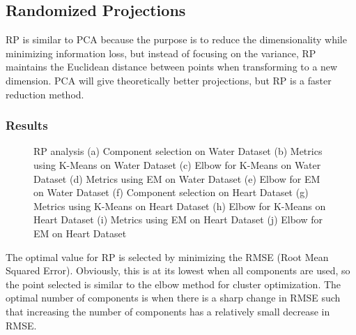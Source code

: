 \documentclass[
	letterpaper, %
]{mlreport}
\begin{document}
\subsection{Randomized Projections}
RP is similar to PCA because the purpose is to reduce the dimensionality while minimizing information loss, but instead of focusing on the variance, RP maintains the Euclidean distance between points when transforming to a new dimension. PCA will give theoretically better projections, but RP is a faster reduction method.

\subsubsection{Results}
\begin{figure}
	\centering
	\caption{RP analysis (a) Component selection on Water Dataset (b) Metrics using K-Means on Water Dataset (c) Elbow for K-Means on Water Dataset (d) Metrics using EM on Water Dataset (e) Elbow for EM on Water Dataset (f) Component selection on Heart Dataset (g) Metrics using K-Means on Heart Dataset (h) Elbow for K-Means on Heart Dataset (i) Metrics using EM on Heart Dataset (j) Elbow for EM on Heart Dataset}
	\label{fig:fig5}
\end{figure}

The optimal value for RP is selected by minimizing the RMSE (Root Mean Squared Error). Obviously, this is at its lowest when all components are used, so the point selected is similar to the elbow method for cluster optimization. The optimal number of components is when there is a sharp change in RMSE such that increasing the number of components has a relatively small decrease in RMSE.
\end{document}
